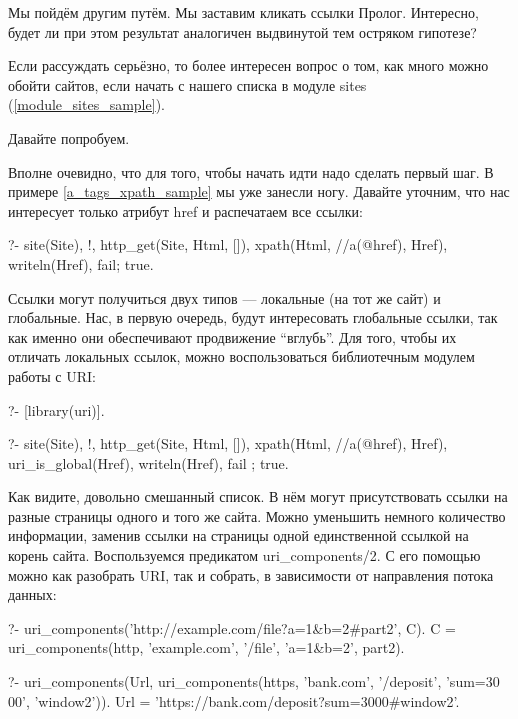 \documentclass[a4paper]{book}
\begin{document}
Мы пойдём другим путём. Мы заставим кликать ссылки
Пролог. Интересно, будет ли при этом результат аналогичен
выдвинутой тем остряком гипотезе?

Если рассуждать серьёзно, то более интересен вопрос о том, как
много можно обойти сайтов, если начать с нашего списка в модуле
sites (\ref{module_sites_sample}). 

Давайте попробуем. 

Вполне очевидно, что для того, чтобы начать идти надо сделать
первый шаг. В примере \ref{a_tags_xpath_sample} мы уже занесли
ногу. Давайте уточним, что нас интересует только атрибут href и
распечатаем все ссылки:

\begin{example}{}{}
?- site(Site), !, http_get(Site, Html, []), 
   xpath(Html, //a(@href), Href), writeln(Href),
   fail; true.
\end{example}

Ссылки могут получиться двух типов --- локальные (на тот же сайт)
и глобальные. Нас, в первую очередь, будут интересовать
глобальные ссылки, так как именно они обеспечивают продвижение
``вглубь''. Для того, чтобы их отличать локальных ссылок, можно
воспользоваться библиотечным модулем работы с URI:

\begin{example}{}{}
?- [library(uri)].

?- site(Site), !, http_get(Site, Html, []), 
   xpath(Html, //a(@href), Href), 
   uri_is_global(Href), writeln(Href), 
   fail ; true.
\end{example}

Как видите, довольно смешанный список. В нём могут присутствовать
ссылки на разные страницы одного и того же сайта. Можно уменьшить
немного количество информации, заменив ссылки на страницы одной
единственной ссылкой на корень сайта. Воспользуемся предикатом
uri_components/2. С его помощью можно как разобрать URI, так и
собрать, в зависимости от направления потока данных:

\begin{example}{}{}
?- uri_components('http://example.com/file?a=1&b=2#part2', C).              
C = uri_components(http, 'example.com', '/file', 'a=1&b=2', part2).

?- uri_components(Url, uri_components(https, 'bank.com', '/deposit', 'sum=30
00', 'window2')).                                                           
Url = 'https://bank.com/deposit?sum=3000#window2'.
\end{example}
\end{document}
